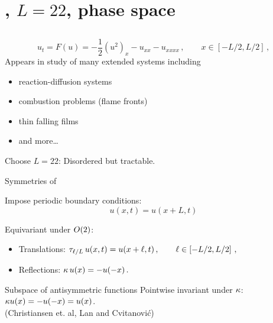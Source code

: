 \documentclass{beamer}
\begin{document}
\section[\KSe]{\KS, $L=22$, phase space }

\subsection{\KSe}

\begin{frame}{\KSe}
\[
  u_t = F(u) = -{\textstyle\frac{1}{2}}(u^2)_x-u_{xx}-u_{xxxx}
    \,,\qquad   x \in [-L/2,L/2]
    \,,
\]
Appears in study of many extended systems including
\begin{itemize}
 \item reaction-diffusion systems
 \item combustion problems (flame fronts)
 \item thin falling films
 \item and more\ldots
\end{itemize}
Choose $L=22$: Disordered but tractable.

\end{frame}


\begin{frame}{Symmetries of \KSe}

Impose periodic boundary conditions:
\[
 u(x,t) = u(x+L,t)
\]



Equivariant under $O(2)$:
\begin{itemize}
 \item Translations: $\tau_{\ell/L}\, u(x,t) = u(x+\ell,t)\,,\qquad \ell\in\left[-L/2,L/2\right]\,,$
 \item Reflections:  $\kappa \, u(x) = -u(-x)\,.$
\end{itemize}

\begin{block}{Subspace of antisymmetric functions} 
Pointwise invariant under $\kappa$: $\kappa u(x)=-u(-x)=u(x)$.\\
(Christiansen et. al, Lan and Cvitanovi\'c) 
\end{block}

\end{frame}
\end{document}
